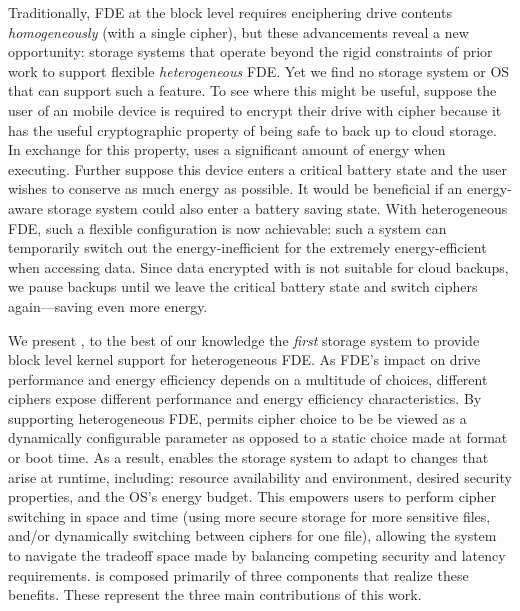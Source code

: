 Traditionally, FDE at the block level requires enciphering drive contents {\em
homogeneously} (with a single cipher), but these advancements reveal a new
opportunity: storage systems that operate beyond the rigid constraints of prior
work to support flexible {\em heterogeneous} FDE. Yet we find no storage system
or OS that can support such a feature. To see where this might be useful,
suppose the user of an mobile device is required to encrypt their drive with
cipher \encA because it has the useful cryptographic property of being safe to
back up to cloud storage. In exchange for this property, \encA uses a
significant amount of energy when executing. Further suppose this device enters
a critical battery state and the user wishes to conserve as much energy as
possible. It would be beneficial if an energy-aware storage system could also
enter a battery saving state. With heterogeneous FDE, such a flexible
configuration is now achievable: such a system can temporarily switch out the
energy-inefficient \encA for the extremely energy-efficient \encB when accessing
data. Since data encrypted with \encB is not suitable for cloud backups, we
pause backups until we leave the critical battery state and switch ciphers
again---saving even more energy.


We present \sys, to the best of our knowledge the {\em first} storage system to
provide block level kernel support for heterogeneous FDE. As FDE's impact on
drive performance and energy efficiency depends on a multitude of choices,
different ciphers expose different performance and energy efficiency
characteristics. By supporting heterogeneous FDE, \sys permits cipher choice to
be be viewed as a dynamically configurable parameter as opposed to a static
choice made at format or boot time. As a result, \sys enables the storage system
to adapt to changes that arise at runtime, including: resource availability and
environment, desired security properties, and the OS's energy budget. This
empowers users to perform cipher switching in space and time (\eg using more
secure storage for more sensitive files, and/or dynamically switching between
ciphers for one file), allowing the system to navigate the tradeoff space made
by balancing competing security and latency requirements.  \sys is composed
primarily of three components that realize these benefits. These represent the
three main contributions of this work.


